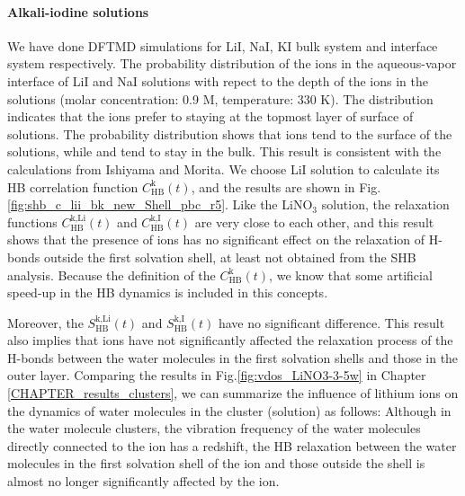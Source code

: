 \paragraph{Alkali-iodine solutions}
We have done DFTMD simulations for LiI, NaI, KI bulk system and interface system respectively.
% 
The probability distribution of the ions in the aqueous-vapor interface of LiI and NaI solutions with repect to the depth 
of the ions in the solutions (molar concentration: 0.9 M, temperature: 330 K). 
The distribution indicates that the \I ions prefer to staying at the topmost layer of surface of solutions.
 The probability distribution shows that \I ions tend to the surface of the solutions, while \Na and \Li tend to stay in the bulk. 
This result is consistent with the calculations from Ishiyama and Morita\cite{TI07,Ishiyama2014}.
We choose LiI solution to calculate its HB correlation function $C^\text{k}_\text{HB}(t)$,
and the results are shown in Fig.\ref{fig:shb_c_lii_bk_new_Shell_pbc_r5}. 
Like the LiNO$_3$ solution, the relaxation functions $C^\text{k,Li}_\text{HB}(t)$ and 
$C^\text{k,I}_\text{HB}(t)$ are very close to each other, 
and this result shows that the presence of ions has no significant effect on the relaxation of H-bonds outside the first solvation shell,
at least not obtained from the SHB analysis. Because the definition of the $C^\text{k}_\text{HB}(t)$, 
we know that some artificial speed-up in the HB dynamics is included in this concepts.


Moreover, the $S^\text{k,Li}_\text{HB}(t)$ and $S^\text{k,I}_\text{HB}(t)$ have no significant difference. 
This result also implies that \Li ions have not significantly affected the relaxation process of the H-bonds 
between the water molecules in the first solvation shells and those in the outer layer. 
Comparing the results in Fig.\thinspace\ref{fig:vdos_LiNO3-3-5w} in Chapter \ref{CHAPTER_results_clusters},
we can summarize the influence of lithium ions on the dynamics of water molecules in the cluster (solution) as follows:
Although in the water molecule clusters, the vibration frequency of the water molecules directly connected to the \Li ion has a redshift, 
the HB relaxation between the water molecules in the first solvation shell of the ion and those outside the shell 
is almost no longer significantly affected by the ion. 


